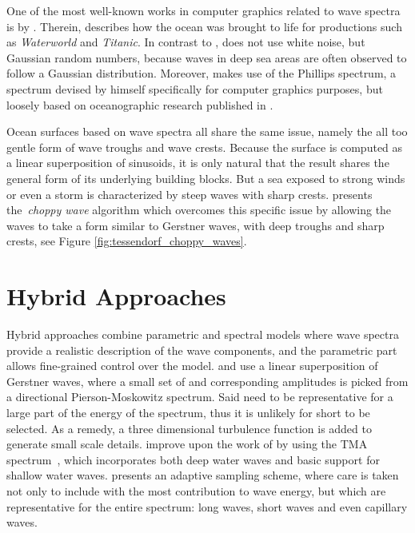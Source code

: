 One of the most well-known works in computer graphics related to wave spectra is
by \citet{course:simulatingocean}. Therein, \citeauthor{course:simulatingocean}
describes how the ocean was brought to life for productions such as
\emph{Waterworld} and \emph{Titanic}. In contrast to \citeauthor{Mastin:1987},
\citeauthor{course:simulatingocean} does not use white noise, but Gaussian
random numbers, because waves in deep sea areas are often observed to follow a
Gaussian distribution. Moreover, \citeauthor{course:simulatingocean}
makes use of the Phillips spectrum, a spectrum devised by himself specifically
for computer graphics purposes, but loosely based on oceanographic research
published in \citet{article:Phillips1958,article:Phillips1985}.

Ocean surfaces based on wave spectra all share the same issue, namely the all too
gentle form of wave troughs and wave crests. Because the surface is computed as
a linear superposition of sinusoids, it is only natural that the result shares
the general form of its underlying building blocks. But a sea exposed to strong
winds or even a storm is characterized by steep waves with sharp crests.
\citet{course:simulatingocean} presents the~\emph{choppy wave} algorithm which
overcomes this specific issue by allowing the waves to take a form similar to
Gerstner waves, with deep troughs and sharp crests, see Figure
\ref{fig:tessendorf_choppy_waves}.

\section{Hybrid Approaches}
Hybrid approaches combine parametric and spectral models where wave spectra
provide a realistic description of the wave components, and the parametric part
allows fine-grained control over the model.
\citet{Thon:2000} and \citet{Thon:2002} use a linear superposition
of Gerstner waves, where a small set of \wavevectors and corresponding
amplitudes is picked from a directional Pierson-Moskowitz spectrum. Said
\wavevectors need to be representative for a large part of the energy of the
spectrum, thus it is unlikely for short \wavelengths to be selected. As a remedy,
a three dimensional turbulence function \citep{Perlin:1985} is added to generate
small scale details. \citet{lee:2007} improve upon the work of
\citeauthor{Thon:2000} by using the TMA spectrum~\citep{Hughes:1984}, which
incorporates both deep water waves and basic support for shallow water waves.
\cite{article:frechot2007} presents an adaptive sampling scheme, where care is
taken not only to include \wavevectors with the most contribution to wave
energy, but \wavevectors which are representative for the entire spectrum:
long waves, short waves and even capillary waves.

